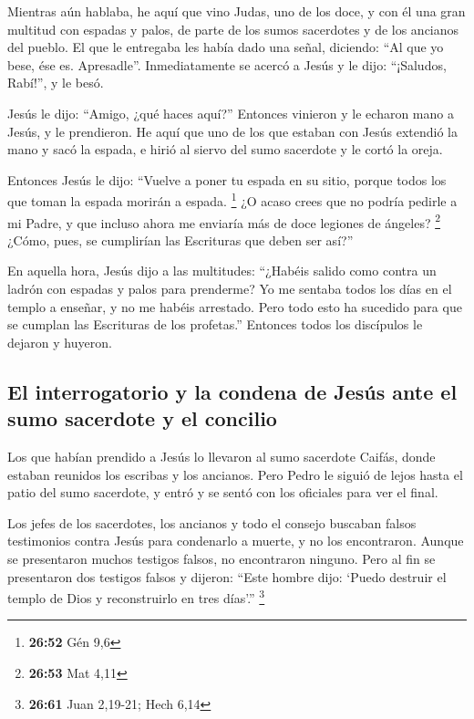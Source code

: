 \begin{paracol}{2}
 Mientras aún hablaba, he aquí que vino Judas, uno de los
doce, y con él una gran multitud con espadas y palos, de parte de los
sumos sacerdotes y de los ancianos del pueblo.  El que le
entregaba les había dado una señal, diciendo: ``Al que yo bese, ése es.
Apresadle''.  Inmediatamente se acercó a Jesús y le dijo:
``¡Saludos, Rabí!'', y le besó.

 Jesús le dijo: ``Amigo, ¿qué haces aquí?'' Entonces
vinieron y le echaron mano a Jesús, y le prendieron.  He
aquí que uno de los que estaban con Jesús extendió la mano y sacó la
espada, e hirió al siervo del sumo sacerdote y le cortó la oreja.

 Entonces Jesús le dijo: ``Vuelve a poner tu espada en su
sitio, porque todos los que toman la espada morirán a espada.
\footnote{\textbf{26:52} Gén 9,6}  ¿O acaso crees que no
podría pedirle a mi Padre, y que incluso ahora me enviaría más de doce
legiones de ángeles? \footnote{\textbf{26:53} Mat 4,11} 
¿Cómo, pues, se cumplirían las Escrituras que deben ser así?''

 En aquella hora, Jesús dijo a las multitudes: ``¿Habéis
salido como contra un ladrón con espadas y palos para prenderme? Yo me
sentaba todos los días en el templo a enseñar, y no me habéis arrestado.
 Pero todo esto ha sucedido para que se cumplan las
Escrituras de los profetas.'' Entonces todos los discípulos le dejaron y
huyeron.

\hypertarget{el-interrogatorio-y-la-condena-de-jesuxfas-ante-el-sumo-sacerdote-y-el-concilio}{%
\subsection{El interrogatorio y la condena de Jesús ante el sumo
sacerdote y el
concilio}\label{el-interrogatorio-y-la-condena-de-jesuxfas-ante-el-sumo-sacerdote-y-el-concilio}}

 Los que habían prendido a Jesús lo llevaron al sumo
sacerdote Caifás, donde estaban reunidos los escribas y los ancianos.
 Pero Pedro le siguió de lejos hasta el patio del sumo
sacerdote, y entró y se sentó con los oficiales para ver el final.

 Los jefes de los sacerdotes, los ancianos y todo el
consejo buscaban falsos testimonios contra Jesús para condenarlo a
muerte,  y no los encontraron. Aunque se presentaron
muchos testigos falsos, no encontraron ninguno. Pero al fin se
presentaron dos testigos falsos  y dijeron: ``Este hombre
dijo: `Puedo destruir el templo de Dios y reconstruirlo en tres días'.''
\footnote{\textbf{26:61} Juan 2,19-21; Hech 6,14}


\end{paracol}
